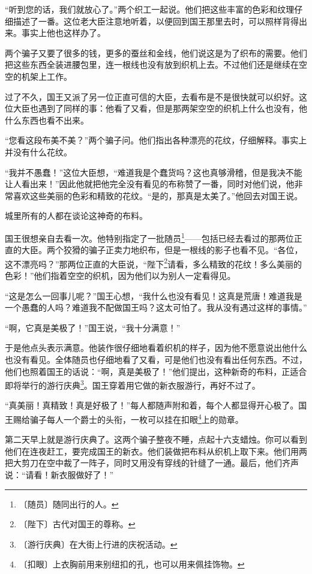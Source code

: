 \documentclass[12pt,UTF-8,openany]{ctexbook}
\begin{document}
\begin{large}
    “听到您的话，我们就放心了。”两个织工一起说。他们把这些丰富的色彩和纹理仔细描述了一番。这位老大臣注意地听着，以便回到国王那里去时，可以照样背得出来。事实上他也这样办了。
    
    两个骗子又要了很多的钱，更多的蚕丝和金线，他们说这是为了织布的需要。他们把这些东西全装进腰包里，连一根线也没有放到织机上去。不过他们还是继续在空空的机架上工作。
    
    过了不久，国王又派了另一位正直可信的大臣，去看布是不是很快就可以织好。这位大臣也遇到了同样的事：他看了又看，但是那两架空空的织机上什么也没有，他什么东西也看不出来。
    
    “您看这段布美不美？”两个骗子问。他们指出各种漂亮的花纹，仔细解释。事实上并没有什么花纹。
    
    “我并不愚蠢！”这位大臣想，“难道我是个蠢货吗？这也真够滑稽，但是我决不能让人看出来！”因此他就把他完全没有看见的布称赞了一番，同时对他们说，他非常喜欢这些美丽的色彩和精致的花纹。“是的，那真是太美了。”他回去对国王说。
    
    城里所有的人都在谈论这神奇的布料。
    
    国王很想亲自去看一次。他特别指定了一批随员\footnote{〔随员〕随同出行的人。}——包括已经去看过的那两位正直的大臣。两个狡猾的骗子正卖力地织布，但是一根线的影子也看不见。“各位，这不漂亮吗？”那两位正直的大臣说，“陛下\footnote{〔陛下〕古代对国王的尊称。}请看，多么精致的花纹！多么美丽的色彩！”他们指着空空的织机，因为他们以为别人一定看得见。
    
    “这是怎么一回事儿呢？”国王心想，“我什么也没有看见！这真是荒唐！难道我是一个愚蠢的人吗？难道我不配做国王吗？这太可怕了。我从没有遇过这样的事情。”
    
    “啊，它真是美极了！”国王说，“我十分满意！”
    
    于是他点头表示满意。他装作很仔细地看着织机的样子，因为他不愿意说出他什么也没有看见。全体随员也仔细地看了又看，可是他们也没有看出任何东西。不过，他们也照着国王的话说：“啊，真是美极了！”他们提出，这种新奇的布料，正适合即将举行的游行庆典\footnote{〔游行庆典〕在大街上行进的庆祝活动。}。国王穿着用它做的新衣服游行，再好不过了。
    
    “真美丽！真精致！真是好极了！”每人都随声附和着，每个人都显得开心极了。国王赐给骗子每人一个爵士的头衔，一枚可以挂在扣眼\footnote{〔扣眼〕上衣胸前用来别纽扣的孔，也可以用来佩挂饰物。}上的勋章。
    
    第二天早上就是游行庆典了。这两个骗子整夜不睡，点起十六支蜡烛。你可以看到他们在连夜赶工，要完成国王的新衣。他们装做把布料从织机上取下来。他们用两把大剪刀在空中裁了一阵子，同时又用没有穿线的针缝了一通。最后，他们齐声说：“请看！新衣服做好了！”
    

\end{large}
\end{document}
